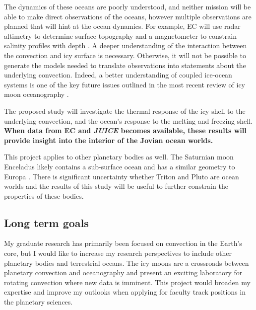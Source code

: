 \documentclass[12pt]{article}
\begin{document}
The dynamics of these oceans are poorly understood, and neither mission will be able to make direct observations of the oceans, however multiple observations are planned that will hint at the ocean dynamics. For example, EC will use radar altimetry to determine surface topography and a magnetometer to constrain salinity profiles with depth \citep{jR23}.  
A deeper understanding of the interaction between the convection and icy surface is necessary. Otherwise, it will not be possible to generate the models needed to translate observations into statements about the underlying convection.
Indeed, a better understanding of coupled ice-ocean systems is one of the key future issues outlined in the most recent review of icy moon oceanography \citep{kS24}. 

The proposed study will investigate the thermal response of the icy shell to the underlying convection, and the ocean's response to the melting and freezing shell. \textbf{When data from EC and \textit{JUICE} becomes available, these results will provide insight into the interior of the Jovian ocean worlds.}

This project applies to other planetary bodies as well. The Saturnian moon Enceladus likely contains a sub-surface ocean and has a similar geometry to Europa \citep{kS24}. There is significant uncertainty whether Triton\citep{jK22} and Pluto\citep{kS24} are ocean worlds and the results of this study will be useful to further constrain the properties of these bodies. 
%
\subsection{Long term goals}
My graduate research has primarily been focused on convection in the Earth's core, but I would like to increase my research perspectives to include other planetary bodies and terrestrial oceans. The icy moons are a crossroads between planetary convection and oceanography and present an exciting laboratory for rotating convection where new data is imminent. This project would broaden my expertise and improve my outlooks when applying for faculty track positions in the planetary sciences.
\end{document}
